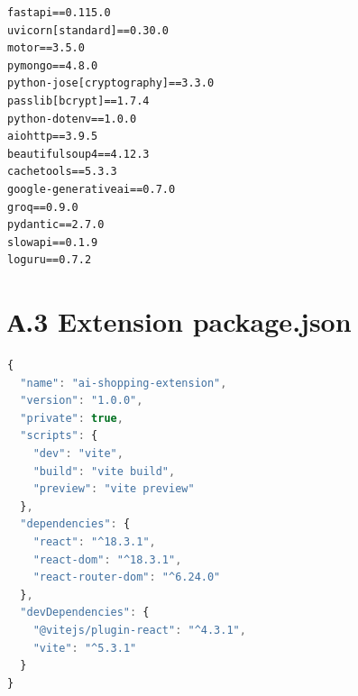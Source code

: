 \documentclass[12pt,a4paper]{report}
\begin{document}
\begin{lstlisting}[caption={requirements.txt --- Python хамаарлуудын жагсаалт}]
fastapi==0.115.0
uvicorn[standard]==0.30.0
motor==3.5.0
pymongo==4.8.0
python-jose[cryptography]==3.3.0
passlib[bcrypt]==1.7.4
python-dotenv==1.0.0
aiohttp==3.9.5
beautifulsoup4==4.12.3
cachetools==5.3.3
google-generativeai==0.7.0
groq==0.9.0
pydantic==2.7.0
slowapi==0.1.9
loguru==0.7.2
\end{lstlisting}

\section*{А.3 Extension package.json}

\begin{lstlisting}[language=JavaScript, caption={extension/package.json}]
{
  "name": "ai-shopping-extension",
  "version": "1.0.0",
  "private": true,
  "scripts": {
    "dev": "vite",
    "build": "vite build",
    "preview": "vite preview"
  },
  "dependencies": {
    "react": "^18.3.1",
    "react-dom": "^18.3.1",
    "react-router-dom": "^6.24.0"
  },
  "devDependencies": {
    "@vitejs/plugin-react": "^4.3.1",
    "vite": "^5.3.1"
  }
}
\end{lstlisting}

\end{document}
